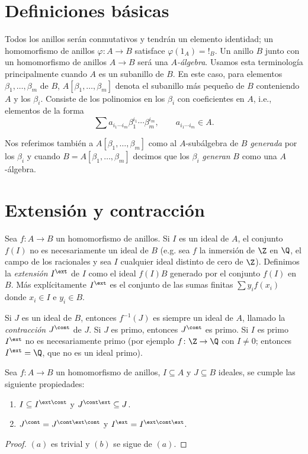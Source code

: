 \section{Definiciones básicas}

Todos los anillos serán conmutativos y tendrán un elemento identidad; un homomorfismo de anillos $\varphi\colon A \to B$ satisface $\varphi(1_A) = !_B$. Un anillo $B$ junto con un homomorfismo de anillos $A\to B$ será una \emph{$A$-álgebra}. Usamos esta terminología principalmente cuando $A$ es un subanillo de $B$. En este caso, para elementos $\beta_1, \ldots, \beta_m$ de $B$, $A[\beta_1,\ldots,\beta_m]$ denota el subanillo más pequeño de $B$ conteniendo $A$ y los $\beta_i$. Consiste de los polinomios en los $\beta_i$ con coeficientes en $A$, i.e., elementos de la forma
\[
  \sum a_{i_1\cdots i_m} \beta_1^{i_1}\cdots \beta_m^{i_m}, \qquad  a_{i_1\cdots i_m} \in A.
\]

Nos referimos también a $A[\beta_1,\ldots, \beta_m]$ como al $A$-subálgebra de $B$ \emph{generada} por los $\beta_i$ y cuando $B = A[\beta_1,\ldots, \beta_m]$ decimos que los $\beta_i$ \emph{generan} $B$ como una $A$-álgebra.




\section{Extensión y contracción}

Sea $f\colon A \to B$ un homomorfismo de anillos. Si $I$ es un ideal de $A$, el conjunto $f(I)$  no es necesariamente un ideal de $B$ (e.g. sea $f$ la inmersión de $\Z$ en $\Q$, el campo de los racionales y sea $I$ cualquier ideal distinto de cero de $\Z$). Definimos la \emph{extensión} $I^\ext$ de $I$ como el ideal $f(I)B$ generado por el conjunto $f(I)$ en $B$. Más explícitamente $I^\ext$ es el conjunto de las sumas finitas $\sum y_i f(x_i)$ donde $x_i \in I$ e $y_i \in B$.

Si $J$ es un ideal de $B$, entonces $f^{-1}(J)$ es siempre un ideal de $A$, llamado la \emph{contracción}  $J^\cont$ de $J$. Si $J$ es primo, entonces $J^\cont$ es primo. Si $I$ es primo $I^\ext$ no es necesariamente primo (por ejemplo $f\colon \Z \to \Q$ con $I\neq 0$; entonces $I^\ext = \Q$, que no es un ideal primo).

\begin{proposition}
  Sea $f\colon A \to B$ un homomorfismo de anillos, $I\subseteq A$ y $J\subseteq B$ ideales, se cumple las siguiente propiedades:
  \begin{enumerate}
    \item $I \subseteq I^{\ext\cont}$ y $J^{\cont\ext} \subseteq J$.
    \item $J^\cont = J^{\cont\ext\cont}$ y $I^\ext = I^{\ext\cont\ext}$.
  \end{enumerate}
\end{proposition}
\begin{proof}
  $(a)$ es trivial y $(b)$ se sigue de $(a)$.
\end{proof}




